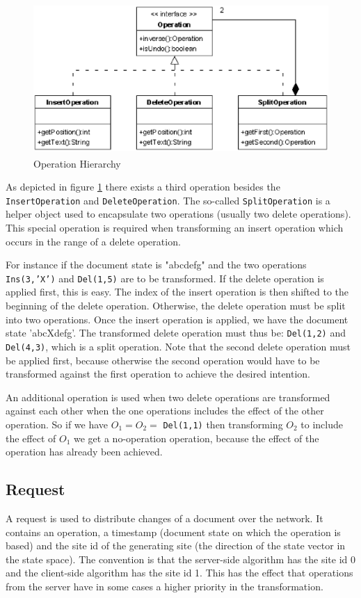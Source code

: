 \begin{figure}[H]
\centering
\includegraphics[height=5.74cm,width=11.59cm]{../images/finalreport/algorithm_operation.eps}
\caption{Operation Hierarchy}
\label{Operation Hierarchy}
\end{figure}

\label{Split_Operation}
As depicted in figure \ref{Operation Hierarchy} there exists a third operation besides the \texttt{InsertOperation} and \texttt{DeleteOperation}. The so-called \texttt{SplitOperation} is a helper object used to encapsulate two operations (usually two delete operations). This special operation is required when transforming an insert operation which occurs in the range of a delete operation. 

For instance if the document state is "abcdefg" and the two operations
\texttt{Ins(3,'X')} and \texttt{Del(1,5)} are to be transformed. If
the delete operation is applied first, this is easy. The index of the insert
operation is then shifted to the beginning of the delete operation. Otherwise,
the delete operation must be split into two operations. Once the insert
operation is applied, we have the document state 'abcXdefg'. The transformed
delete operation must thus be: \texttt{Del(1,2)} and \texttt{Del(4,3)},
which is a split operation. Note that the second delete operation must be
applied first, because otherwise the second operation would have to be
transformed against the first operation to achieve the desired intention.

An additional operation is used when two delete operations are transformed
against each other when the one operations includes the effect of the other
operation. So if we have $O_1 = O_2 = $ \texttt{Del(1,1)} then transforming
$O_2$ to include the effect of $O_1$ we get a no-operation operation, because
the effect of the operation has already been achieved.


\subsection{Request}
A request is used to distribute changes of a document over the network. It 
contains an operation, a timestamp (document 
state on which the operation is based) and the site id of the generating site
(the direction of the state vector in the state space). The convention is
that the server-side algorithm has the site id 0 and the client-side
algorithm has the site id 1. This has the effect that operations
from the server have in some cases a higher priority in the transformation.

